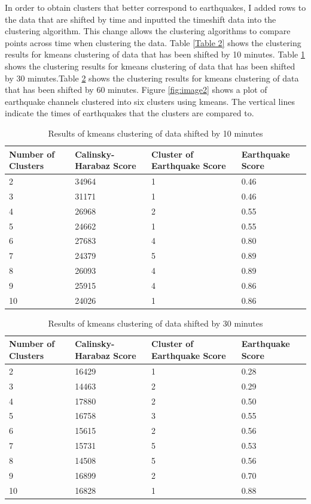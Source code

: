 \documentclass[colorlinks=true,pdfstartview=FitV,linkcolor=blue,
            citecolor=red,urlcolor=magenta]{ligodoc}
\begin{document}
\par In order to obtain clusters that better correspond to earthquakes, I added rows to the data that are shifted by time and inputted the timeshift data into the clustering algorithm. This change allows the clustering algorithms to compare points across time when clustering the data. Table \ref{Table 2} shows the clustering results for kmeans clustering of data that has been shifted by 10 minutes. Table \ref{Table 3} shows the clustering results for kmeans clustering of data that has been shifted by 30 minutes.Table \ref{Table 4} shows the clustering results for kmeans clustering of data that has been shifted by 60 minutes. Figure \ref{fig:image2} shows a plot of earthquake channels clustered into six clusters using kmeans. The vertical lines indicate the times of earthquakes that the clusters are compared to.

\begin{table}[h!]
\centering
 \begin{tabular}{| m{3.5cm} m{3.5cm} m{3.5cm} m{3.5cm}|} 
 \hline
 Number of Clusters & Calinsky-Harabaz Score & Cluster of Earthquake Score & Earthquake Score\\ [0.5ex] 
 \hline\hline
 2 & 34964 & 1 & 0.46\\ 
 \hline
 3 & 31171 & 1 & 0.46\\
 \hline
 4 & 26968 & 2 & 0.55\\
 \hline
 5 & 24662 & 1 & 0.55\\
 \hline
 6 & 27683 & 4 & 0.80\\ 
 \hline
 7 & 24379 & 5 & 0.89\\
 \hline
 8 & 26093 & 4 & 0.89\\
 \hline
 9 & 25915 & 4 & 0.86\\
 \hline
 10 & 24026 & 1 & 0.86\\
 \hline
 \end{tabular}
 \caption{Results of kmeans clustering of data shifted by 10 minutes}
 \label{Table 3}
\end{table}


\begin{table}[h!]
\centering
 \begin{tabular}{| m{3.5cm} m{3.5cm} m{3.5cm} m{3.5cm}|} 
 \hline
 Number of Clusters & Calinsky-Harabaz Score & Cluster of Earthquake Score & Earthquake Score\\ [0.5ex] 
 \hline\hline
 2 & 16429 & 1 & 0.28\\ 
 \hline
 3 & 14463 & 2 & 0.29\\
 \hline
 4 & 17880 & 2 & 0.50\\
 \hline
 5 & 16758 & 3 & 0.55\\
 \hline
 6 & 15615 & 2 & 0.56\\ 
 \hline
 7 & 15731 & 5 & 0.53\\
 \hline
 8 & 14508 & 5 & 0.56\\
 \hline
 9 & 16899 & 2 & 0.70\\
 \hline
 10 & 16828 & 1 & 0.88\\
 \hline
 \end{tabular}
 \caption{Results of kmeans clustering of data shifted by 30 minutes}
 \label{Table 4}
\end{table}
\end{document}
